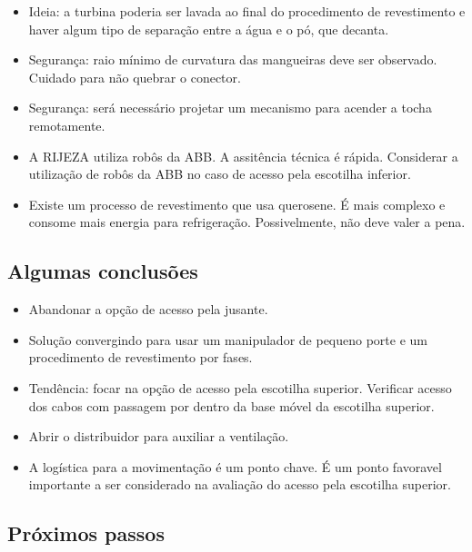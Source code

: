 \documentclass[12pt,a4paper]{article}
\begin{document}
\begin{itemize}
  \item Ideia: a turbina poderia ser lavada ao final do procedimento de
  revestimento e haver algum tipo de separação entre a água e o pó, que
  decanta.

  \item Segurança: raio mínimo de curvatura das mangueiras deve ser observado.
  Cuidado para não quebrar o conector.

  \item Segurança: será necessário projetar um mecanismo para acender a tocha
  remotamente.

  \item A RIJEZA utiliza robôs da ABB. A assitência técnica é rápida. Considerar
  a utilização de robôs da ABB no caso de acesso pela escotilha inferior.

  \item Existe um processo de revestimento que usa querosene. É mais complexo e
  consome mais energia para refrigeração. Possivelmente, não deve valer a pena.

\end{itemize}

\subsection{Algumas conclusões}

\begin{itemize}
  \item Abandonar a opção de acesso pela jusante.

  \item Solução convergindo para usar um manipulador de pequeno porte e um procedimento de revestimento por fases.

  \item Tendência: focar na opção de acesso pela escotilha superior. Verificar
  acesso dos cabos com passagem por dentro da base móvel da escotilha superior.
  
  \item Abrir o distribuidor para auxiliar a ventilação.

  \item A logística para a movimentação é um ponto chave. É um ponto favoravel
  importante a ser considerado na avaliação do acesso pela escotilha superior.

\end{itemize}


\subsection{Próximos passos}
\end{document}
